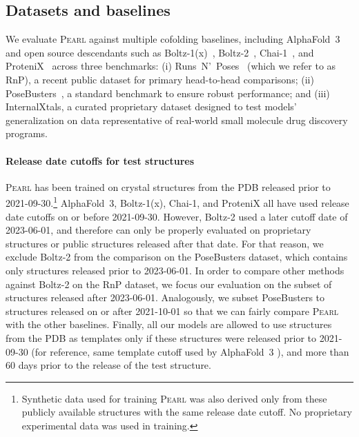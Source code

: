 \documentclass[11pt, letterpaper, onecolumn]{tau-class/tau}
\newcommand{\pearl}{\textsc{Pearl}\xspace}
\newcommand{\alphafold}[1]{AlphaFold~#1\xspace}
\newcommand{\boltz}[1]{\mbox{Boltz-#1\xspace}}
\newcommand{\chai}[1]{\mbox{Chai-#1\xspace}}
\newcommand{\protenix}{ProteniX\xspace}
\newcommand{\runsnposes}{Runs~N'~Poses\xspace}
\newcommand{\rnp}{RnP\xspace}
\newcommand{\posebusters}{PoseBusters\xspace}
\newcommand{\internalxtals}{InternalXtals\xspace}
\newcommand{\fmtdate}[1]{\mbox{#1\xspace}}
\begin{document}
\subsection{Datasets and baselines}
\label{app:eval:datasets}
We evaluate \pearl against multiple cofolding baselines, including \alphafold3 \cite{abramson2024accurate} and open source descendants such as \boltz1(x)~\cite{wohlwend2024boltz1}, \boltz2~\cite{passaro2025boltz2}, \chai1~\cite{chai2024chai}, and ProteniX~\cite{bytedance2025protenix} across three benchmarks:
(i) \runsnposes~\cite{vskrinjar2025have} (which we refer to as \rnp), a recent public dataset for primary head-to-head comparisons; (ii) \posebusters~\cite{buttenschoen2024posebusters}, a standard benchmark to ensure robust performance; and (iii) \internalxtals, a curated proprietary dataset designed to test models' generalization on data representative of real-world small molecule drug discovery programs.

\paragraph{Release date cutoffs for test structures}
\pearl has been trained on crystal structures from the PDB released prior to \fmtdate{2021-09-30}.\footnote{\footnotesize Synthetic data used for training \pearl was also derived only from these publicly available structures with the same release date cutoff. No proprietary experimental data was used in training.}
\alphafold3, \boltz1(x), \chai1, and \protenix all have used release date cutoffs on or before \fmtdate{2021-09-30}.
However, \boltz2 used a later cutoff date of \fmtdate{2023-06-01}, and therefore can only be properly evaluated on proprietary structures or public structures released after that date.
For that reason, we exclude \boltz2 from the comparison on the \posebusters dataset, which contains only structures released prior to \fmtdate{2023-06-01}.
In order to compare other methods against \boltz2 on the \rnp dataset, we focus our evaluation on the subset of structures released after \fmtdate{2023-06-01}.
Analogously, we subset \posebusters to structures released on or after \fmtdate{2021-10-01} so that we can fairly compare \pearl with the other baselines.
Finally, all our models are allowed to use structures from the PDB as templates only if these structures were released prior to \fmtdate{2021-09-30} (for reference, same template cutoff used by \alphafold3 \cite{abramson2024accurate}), and more than 60 days prior to the release of the test structure.
\end{document}
